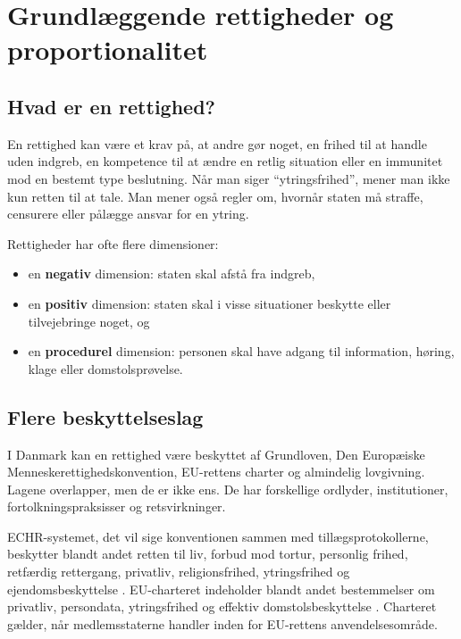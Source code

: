 \chapter{Grundlæggende rettigheder og proportionalitet}


\section{Hvad er en rettighed?}

En rettighed kan være et krav på, at andre gør noget, en frihed til at handle uden indgreb, en kompetence til at ændre en retlig situation eller en immunitet mod en bestemt type beslutning. Når man siger ``ytringsfrihed'', mener man ikke kun retten til at tale. Man mener også regler om, hvornår staten må straffe, censurere eller pålægge ansvar for en ytring.

Rettigheder har ofte flere dimensioner:
\begin{itemize}
  \item en \textbf{negativ} dimension: staten skal afstå fra indgreb,
  \item en \textbf{positiv} dimension: staten skal i visse situationer beskytte eller tilvejebringe noget, og
  \item en \textbf{procedurel} dimension: personen skal have adgang til information, høring, klage eller domstolsprøvelse.
\end{itemize}

\section{Flere beskyttelseslag}

I Danmark kan en rettighed være beskyttet af Grundloven, Den Europæiske Menneskerettighedskonvention, EU-rettens charter og almindelig lovgivning. Lagene overlapper, men de er ikke ens. De har forskellige ordlyder, institutioner, fortolkningspraksisser og retsvirkninger.

ECHR-systemet, det vil sige konventionen sammen med tillægsprotokollerne, beskytter blandt andet retten til liv, forbud mod tortur, personlig frihed, retfærdig rettergang, privatliv, religionsfrihed, ytringsfrihed og ejendomsbeskyttelse \citep{echr}. EU-charteret indeholder blandt andet bestemmelser om privatliv, persondata, ytringsfrihed og effektiv domstolsbeskyttelse \citep{charter}. Charteret gælder, når medlemsstaterne handler inden for EU-rettens anvendelsesområde.

